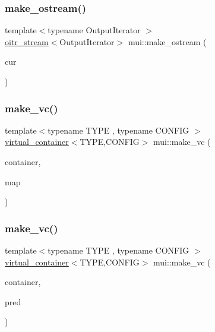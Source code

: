 \mbox{\label{namespacemui_a77ab20df376b43366b058222ce36fb97}} 
\subsubsection{\texorpdfstring{make\+\_\+ostream()}{make\_ostream()}}
{\footnotesize\ttfamily template$<$typename Output\+Iterator $>$ \\
\hyperlink{classmui_1_1oitr__stream}{oitr\+\_\+stream}$<$Output\+Iterator$>$ mui\+::make\+\_\+ostream (\begin{DoxyParamCaption}\item[{Output\+Iterator}]{cur }\end{DoxyParamCaption})}

\mbox{\label{namespacemui_a8c0452b30fd8fcca78b5d6c407e6658f}} 
\subsubsection{\texorpdfstring{make\+\_\+vc()}{make\_vc()}\hspace{0.1cm}{\footnotesize\ttfamily [1/2]}}
{\footnotesize\ttfamily template$<$typename T\+Y\+PE , typename C\+O\+N\+F\+IG $>$ \\
\hyperlink{classmui_1_1virtual__container}{virtual\+\_\+container}$<$T\+Y\+PE,C\+O\+N\+F\+IG$>$ mui\+::make\+\_\+vc (\begin{DoxyParamCaption}\item[{const std\+::vector$<$ typename C\+O\+N\+F\+I\+G\+::point\+\_\+type, T\+Y\+PE $>$ \&}]{container,  }\item[{const std\+::vector$<$ size\+\_\+t $>$ \&}]{map }\end{DoxyParamCaption})}

\mbox{\label{namespacemui_ab66112b8a8cf6fa0ce4200ca87d40434}} 
\subsubsection{\texorpdfstring{make\+\_\+vc()}{make\_vc()}\hspace{0.1cm}{\footnotesize\ttfamily [2/2]}}
{\footnotesize\ttfamily template$<$typename T\+Y\+PE , typename C\+O\+N\+F\+IG $>$ \\
\hyperlink{classmui_1_1virtual__container}{virtual\+\_\+container}$<$T\+Y\+PE,C\+O\+N\+F\+IG$>$ mui\+::make\+\_\+vc (\begin{DoxyParamCaption}\item[{const std\+::vector$<$ std\+::pair$<$ typename C\+O\+N\+F\+I\+G\+::point\+\_\+type, T\+Y\+PE $>$ $>$ \&}]{container,  }\item[{const std\+::vector$<$ bool $>$ \&}]{pred }\end{DoxyParamCaption})}

